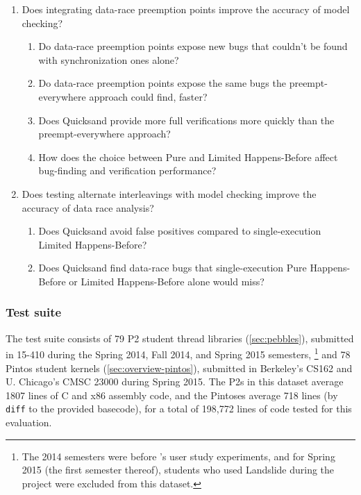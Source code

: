 \begin{enumerate}
	\item Does integrating data-race preemption points improve the accuracy of model checking?
		\begin{enumerate}
			\item Do data-race preemption points expose new bugs that couldn't be found with
				synchronization ones alone?
			\item Do data-race preemption points expose the same bugs
				the preempt-everywhere approach could find, faster?
			\item Does Quicksand provide more full verifications %
				more quickly than the preempt-everywhere approach?
			\item How does the choice between Pure and Limited Happens-Before
				affect bug-finding and verification performance?
		\end{enumerate}
	\item Does testing alternate interleavings with model checking improve the accuracy of data race analysis?
		\begin{enumerate}
			\item Does Quicksand avoid false positives compared to single-execution Limited Happens-Before?
			\item Does Quicksand find data-race bugs that single-execution Pure Happens-Before or Limited Happens-Before alone would miss?
		\end{enumerate}
\end{enumerate}

\subsubsection{Test suite}
\label{sec:quicksand-eval-suite}

The test suite consists of 79 P2 student thread libraries (\cref{sec:pebbles}),
submitted in 15-410 during the Spring 2014, Fall 2014, and Spring 2015 semesters,%
\footnote{The 2014 semesters were before 's user study experiments,
and for Spring 2015 (the first semester thereof),
students who used Landslide during the project were excluded from this dataset.}
and 78 Pintos student kernels (\cref{sec:overview-pintos}),
submitted in Berkeley's CS162 and U. Chicago's CMSC 23000 during Spring 2015.
The P2s in this dataset average 1807 lines of C and x86 assembly code,
and the Pintoses average 718 lines (by {\tt diff} to the provided basecode),
for a total of 198,772 lines of code tested for this evaluation.


